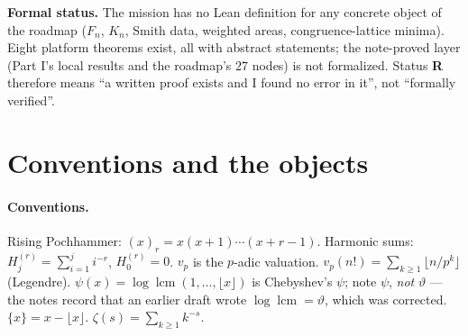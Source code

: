 \documentclass[11pt]{article}
\newcommand{\stR}{\textcolor{okgreen}{\textbf{R}}}
\newcommand{\vp}{v_p}
\DeclareMathOperator{\lcm}{lcm}
\begin{document}
\textbf{Formal status.} The mission has no Lean definition for any concrete object of the roadmap
($F_n$, $K_n$, Smith data, weighted areas, congruence-lattice minima). Eight platform theorems exist,
all with abstract statements; the note-proved layer (Part I's local results and the roadmap's $27$
nodes) is not formalized. Status \stR{} therefore means ``a written proof exists and I found no error
in it'', not ``formally verified''.

\section{Conventions and the objects}

\paragraph{Conventions.}
Rising Pochhammer: $(x)_r=x(x+1)\cdots(x+r-1)$. Harmonic sums: $H_j^{(r)}=\sum_{i=1}^{j}i^{-r}$,
$H_0^{(r)}=0$. $\vp$ is the $p$-adic valuation. $v_p(n!)=\sum_{k\ge1}\lfloor n/p^k\rfloor$ (Legendre).
$\psi(x)=\log\lcm(1,\dots,\lfloor x\rfloor)$ is Chebyshev's $\psi$; note $\psi$, \emph{not} $\vartheta$
--- the notes record that an earlier draft wrote $\log\lcm=\vartheta$, which was corrected.
$\{x\}=x-\lfloor x\rfloor$. $\zeta(s)=\sum_{k\ge1}k^{-s}$.
\end{document}
